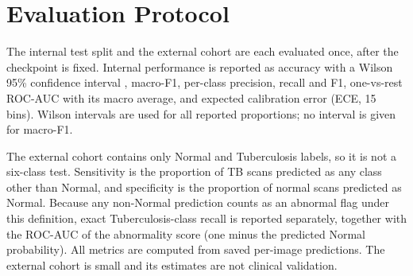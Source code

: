 \section{Evaluation Protocol}\label{sec:experiments}
The internal test split and the external cohort are each evaluated once, after the checkpoint is fixed.
Internal performance is reported as accuracy with a Wilson 95\% confidence interval
\cite{wilson1927probable}, macro-F1, per-class precision, recall and F1, one-vs-rest ROC-AUC with its
macro average, and expected calibration error (ECE, 15 bins). Wilson intervals are used for all reported
proportions; no interval is given for macro-F1.

The external cohort contains only Normal and Tuberculosis labels, so it is not a six-class test.
Sensitivity is the proportion of TB scans predicted as any class other than Normal, and specificity is
the proportion of normal scans predicted as Normal. Because any non-Normal prediction counts as an
abnormal flag under this definition, exact Tuberculosis-class recall is reported separately, together
with the ROC-AUC of the abnormality score (one minus the predicted Normal probability). All metrics are
computed from saved per-image predictions. The external cohort is small and its estimates are not
clinical validation.

